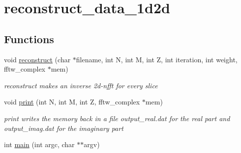 \hypertarget{group__applications__mri3d__reconstruct__data__1d2d}{
\section{reconstruct\_\-data\_\-1d2d}
\label{group__applications__mri3d__reconstruct__data__1d2d}
}
\subsection*{Functions}
\begin{CompactItemize}
\item 
\hypertarget{group__applications__mri3d__reconstruct__data__1d2d_gc5145e86c748eb2aa69cd41e80dd5bd0}{
void \hyperlink{group__applications__mri3d__reconstruct__data__1d2d_gc5145e86c748eb2aa69cd41e80dd5bd0}{reconstruct} (char $\ast$filename, int N, int M, int Z, int iteration, int weight, fftw\_\-complex $\ast$mem)}
\label{group__applications__mri3d__reconstruct__data__1d2d_gc5145e86c748eb2aa69cd41e80dd5bd0}

\begin{CompactList}\small\item\em reconstruct makes an inverse 2d-nfft for every slice \item\end{CompactList}\item 
\hypertarget{group__applications__mri3d__reconstruct__data__1d2d_g2794364dedbb67a9984208e6f11aec81}{
void \hyperlink{group__applications__mri3d__reconstruct__data__1d2d_g2794364dedbb67a9984208e6f11aec81}{print} (int N, int M, int Z, fftw\_\-complex $\ast$mem)}
\label{group__applications__mri3d__reconstruct__data__1d2d_g2794364dedbb67a9984208e6f11aec81}

\begin{CompactList}\small\item\em print writes the memory back in a file output\_\-real.dat for the real part and output\_\-imag.dat for the imaginary part \item\end{CompactList}\item 
\hypertarget{group__applications__mri3d__reconstruct__data__1d2d_g3c04138a5bfe5d72780bb7e82a18e627}{
int \hyperlink{group__applications__mri3d__reconstruct__data__1d2d_g3c04138a5bfe5d72780bb7e82a18e627}{main} (int argc, char $\ast$$\ast$argv)}
\label{group__applications__mri3d__reconstruct__data__1d2d_g3c04138a5bfe5d72780bb7e82a18e627}

\end{CompactItemize}
